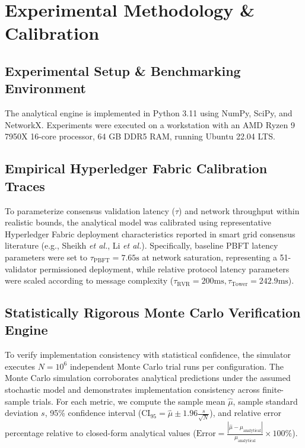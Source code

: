 \documentclass[10pt,twocolumn,journal]{IEEEtran}
\begin{document}
\section{Experimental Methodology & Calibration}
\label{sec:methodology_exp}

\subsection{Experimental Setup & Benchmarking Environment}
The analytical engine is implemented in Python 3.11 using NumPy, SciPy, and NetworkX. Experiments were executed on a workstation with an AMD Ryzen 9 7950X 16-core processor, 64 GB DDR5 RAM, running Ubuntu 22.04 LTS.

\subsection{Empirical Hyperledger Fabric Calibration Traces}
To parameterize consensus validation latency ($\tau$) and network throughput within realistic bounds, the analytical model was calibrated using representative Hyperledger Fabric deployment characteristics reported in smart grid consensus literature (e.g., Sheikh \textit{et al.}, Li \textit{et al.}). Specifically, baseline PBFT latency parameters were set to $\tau_{\text{PBFT}} = 7.65\text{s}$ at network saturation, representing a 51-validator permissioned deployment, while relative protocol latency parameters were scaled according to message complexity ($\tau_{\text{RVR}} = 200\text{ms}, \tau_{\text{Tower}} = 242.9\text{ms}$).

\subsection{Statistically Rigorous Monte Carlo Verification Engine}
To verify implementation consistency with statistical confidence, the simulator executes $N = 10^6$ independent Monte Carlo trial runs per configuration. The Monte Carlo simulation corroborates analytical predictions under the assumed stochastic model and demonstrates implementation consistency across finite-sample trials. For each metric, we compute the sample mean $\hat{\mu}$, sample standard deviation $s$, 95\% confidence interval ($\text{CI}_{95} = \hat{\mu} \pm 1.96 \frac{s}{\sqrt{N}}$), and relative error percentage relative to closed-form analytical values ($\text{Error} = \frac{|\hat{\mu} - \mu_{\text{analytical}}|}{\mu_{\text{analytical}}} \times 100\%$).
\end{document}
